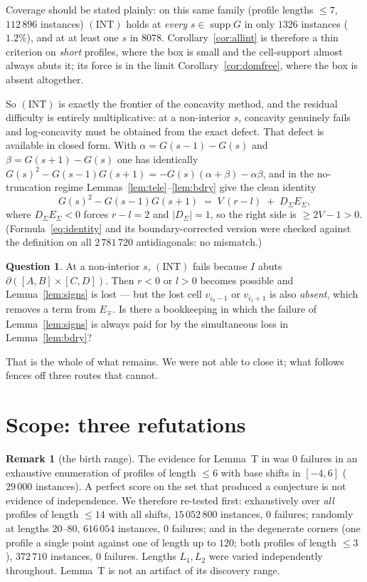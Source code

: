 \documentclass[11pt]{article}
\theoremstyle{definition}
\newtheorem{remark}[theorem]{Remark}
\newtheorem{question}[theorem]{Question}
\DeclareMathOperator{\supp}{supp}
\newcommand{\INT}{(\mathrm{INT})}
\begin{document}
Coverage should be stated plainly: on this same family (profile lengths $\le7$,
$112\,896$ instances) $\INT$ holds at \emph{every} $s\in\supp G$ in only $1326$ instances
($1.2\%$), and at at least one $s$ in $8078$. Corollary~\ref{cor:allint} is therefore a
thin criterion on \emph{short} profiles, where the box is small and the cell-support
almost always abuts it; its force is in the limit
Corollary~\ref{cor:domfree}, where the box is absent altogether.

So $\INT$ is exactly the frontier of the concavity method, and the residual difficulty is
entirely multiplicative: at a non-interior $s$, concavity genuinely fails and
log-concavity must be obtained from the exact defect. That defect is available in closed
form. With $\alpha=G(s-1)-G(s)$ and $\beta=G(s+1)-G(s)$ one has identically
$G(s)^2-G(s-1)G(s+1)=-G(s)(\alpha+\beta)-\alpha\beta$, and in the no-truncation regime
Lemmas~\ref{lem:tele}--\ref{lem:bdry} give the clean identity
\begin{equation}\label{eq:identity}
  G(s)^2-G(s-1)G(s+1)\;=\;V\,(r-l)\;+\;D_\Sigma E_\Sigma ,
\end{equation}
where $D_\Sigma E_\Sigma<0$ forces $r-l=2$ and $|D_\Sigma|=1$, so the right side is
$\ge 2V-1>0$. (Formula~\eqref{eq:identity} and its boundary-corrected version were
checked against the definition on all $2\,781\,720$ antidiagonals: no mismatch.)

\begin{question}
At a non-interior $s$, $\INT$ fails because $I$ abuts $\partial([A,B]\times[C,D])$. Then
$r<0$ or $l>0$ becomes possible and Lemma~\ref{lem:signs} is lost --- but the lost cell
$v_{i_0-1}$ or $v_{i_1+1}$ is also \emph{absent}, which removes a term from
$E_\mp$. Is there a bookkeeping in which the failure of Lemma~\ref{lem:signs} is always
paid for by the simultaneous loss in Lemma~\ref{lem:bdry}?
\end{question}

That is the whole of what remains. We were not able to close it; what follows fences off
three routes that cannot.

\section{Scope: three refutations}

\begin{remark}[the birth range]\label{rem:birth}
The evidence for Lemma~T in \cite[Rem.~4.5]{c1} was $0$ failures in an exhaustive
enumeration of profiles of length $\le6$ with base shifts in $[-4,6]$ ($29\,000$
instances). A perfect score on the set that produced a conjecture is not evidence of
independence. We therefore re-tested first: exhaustively over \emph{all} profiles of
length $\le14$ with all shifts, $15\,052\,800$ instances, $0$ failures; randomly at
lengths $20$--$80$, $616\,054$ instances, $0$ failures; and in the degenerate corners
(one profile a single point against one of length up to $120$; both profiles of length
$\le3$), $372\,710$ instances, $0$ failures. Lengths $L_1,L_2$ were varied
independently throughout. Lemma~T is not an artifact of its discovery range.
\end{remark}
\end{document}
